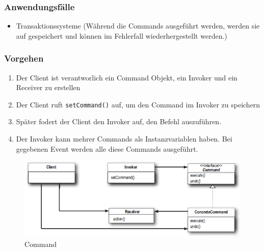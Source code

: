 \subsubsection{Anwendungsfälle}
\begin{itemize}
	\item Transaktionssysteme (Während die Commands ausgeführt werden, werden sie auf gespeichert und können im Fehlerfall wiederhergestellt werden.)
\end{itemize}

\subsubsection{Vorgehen}
\begin{enumerate}
	\item Der Client ist verantworlich ein Command Objekt, ein Invoker und ein Receiver zu erstellen
	\item Der Client ruft \lstinline|setCommand()| auf, um den Command im Invoker zu speichern
	\item Später fodert der Client den Invoker auf, den Befehl auszuführen. 
	\item Der Invoker kann mehrer Commands als Instanzvariablen haben. Bei gegebenen Event werden alle diese Commands ausgeführt.
\end{enumerate}

\begin{figure}[h]
	\centering
	\includegraphics[width=0.7\linewidth]{images/command_pattern}
	\caption{Command}
	\label{fig:commandpattern}
\end{figure}

